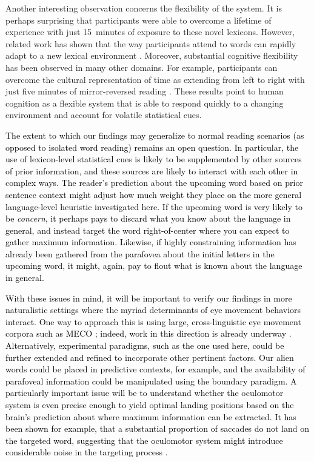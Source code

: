 \documentclass[doc,biblatex]{apa7}
\newcommand\newmaterial[1]{\textcolor{black}{#1}}
\begin{document}
Another interesting observation concerns the flexibility of the system. It is perhaps surprising that participants were able to overcome a lifetime of experience with just 15~minutes of exposure to these novel lexicons. However, related work has shown that the way participants attend to words can rapidly adapt to a new lexical environment \parencite{Ducrot:2002}. Moreover, substantial cognitive flexibility has been observed in many other domains. For example, participants can overcome the cultural representation of time as extending from left to right with just five minutes of mirror-reversed reading \parencite{Casasanto:2014}. These results point to human cognition as a flexible system that is able to respond quickly to a changing environment and account for volatile statistical cues.

\newmaterial{The extent to which our findings may generalize to normal reading scenarios (as opposed to isolated word reading) remains an open question. In particular, the use of lexicon-level statistical cues is likely to be supplemented by other sources of prior information, and these sources are likely to interact with each other in complex ways. The reader's prediction about the upcoming word based on prior sentence context might adjust how much weight they place on the more general language-level heuristic investigated here. If the upcoming word is very likely to be \textit{concern}, it perhaps pays to discard what you know about the language in general, and instead target the word right-of-center where you can expect to gather maximum information. Likewise, if highly constraining information has already been gathered from the parafovea about the initial letters in the upcoming word, it might, again, pay to flout what is known about the language in general.}

\newmaterial{With these issues in mind, it will be important to verify our findings in more naturalistic settings where the myriad determinants of eye movement behaviors interact. One way to approach this is using large, cross-linguistic eye movement corpora such as MECO \parencite{Siegelman:2022}; indeed, work in this direction is already underway \parencite{Shafir:2022}. Alternatively, experimental paradigms, such as the one used here, could be further extended and refined to incorporate other pertinent factors. Our alien words could be placed in predictive contexts, for example, and the availability of parafoveal information could be manipulated using the boundary paradigm. A particularly important issue will be to understand whether the oculomotor system is even precise enough to yield optimal landing positions based on the brain's prediction about where maximum information can be extracted. It has been shown for example, that a substantial proportion of saccades do not land on the targeted word, suggesting that the oculomotor system might introduce considerable noise in the targeting process \parencite{Engbert:2008}.}
\end{document}
